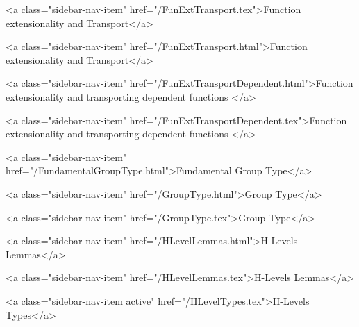       
    
      
        
          <a class="sidebar-nav-item" href="/FunExtTransport.tex">Function extensionality and Transport</a>
        
      
    
      
        
          <a class="sidebar-nav-item" href="/FunExtTransport.html">Function extensionality and Transport</a>
        
      
    
      
        
          <a class="sidebar-nav-item" href="/FunExtTransportDependent.html">Function extensionality and transporting dependent functions </a>
        
      
    
      
        
          <a class="sidebar-nav-item" href="/FunExtTransportDependent.tex">Function extensionality and transporting dependent functions </a>
        
      
    
      
        
          <a class="sidebar-nav-item" href="/FundamentalGroupType.html">Fundamental Group Type</a>
        
      
    
      
        
          <a class="sidebar-nav-item" href="/GroupType.html">Group Type</a>
        
      
    
      
        
          <a class="sidebar-nav-item" href="/GroupType.tex">Group Type</a>
        
      
    
      
        
          <a class="sidebar-nav-item" href="/HLevelLemmas.html">H-Levels Lemmas</a>
        
      
    
      
        
          <a class="sidebar-nav-item" href="/HLevelLemmas.tex">H-Levels Lemmas</a>
        
      
    
      
        
          <a class="sidebar-nav-item active" href="/HLevelTypes.tex">H-Levels Types</a>
        
      
    
